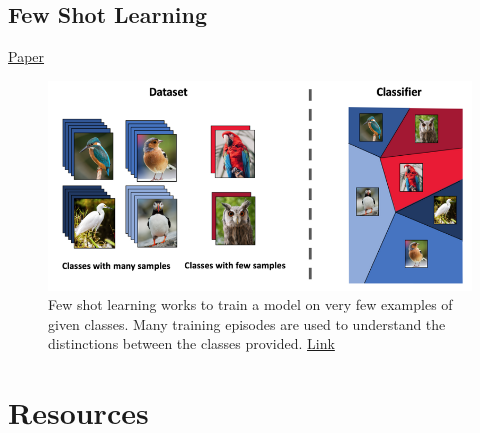 \documentclass{article}
\begin{document}
\newpage
\subsection{Few Shot Learning}
\href{https://openreview.net/forum?id=HkxLXnAcFQ}{Paper}
\begin{figure}[H]
    \centering
    \includegraphics[width=4.5in]{fewshot.png}
    \caption{Few shot learning works to train a model on very few examples of given classes. Many training episodes are used to understand the distinctions between the classes provided.  \href{https://medium.com/sap-machine-learning-research/deep-few-shot-learning-a1caa289f18}{Link}}
\end{figure}

\newpage
\section{Resources}
\end{document}

